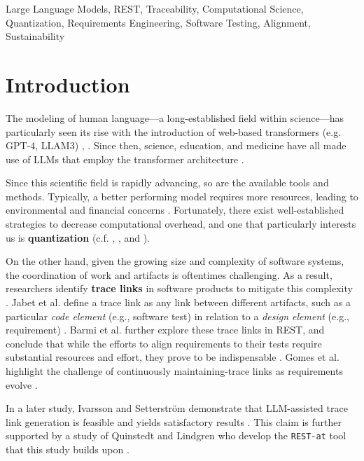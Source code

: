 \documentclass[conference]{IEEEtran}
\begin{document}
\begin{IEEEkeywords}
Large Language Models, REST, Traceability, Computational Science, Quantization,
Requirements Engineering, Software Testing, Alignment, Sustainability
\end{IEEEkeywords}

\section{Introduction}\label{intro}

The modeling of human language---a long-established field within science---has
particularly seen its rise with the introduction of web-based transformers (e.g.
GPT-4, LLAM3) \cite{jones1994Natural}, \cite{vaswani2017Attention}. Since then,
science, education, and medicine have all made use of LLMs that employ the
transformer architecture \cite{naveed2024Comprehensive}.

Since this scientific field is rapidly advancing, so are the available tools and
methods. Typically, a better performing model requires more resources, leading
to environmental and financial concerns \cite{naveed2024Comprehensive}.
Fortunately, there exist well-established strategies to decrease computational
overhead, and one that particularly interests us is \textbf{quantization} (c.f.
\cite{zhu2024Survey}, \cite{lin2024AWQ}, and \cite{chen2024EfficientQAT}).

On the other hand, given the growing size and complexity of software systems,
the coordination of work and artifacts is oftentimes challenging. As a result,
researchers identify \textbf{trace links} in software products to mitigate this
complexity \cite{jaber2013Effect}. Jabet et al. define a trace link as any link
between different artifacts, such as a particular \textit{code element} (e.g.,
software test) in relation to a \textit{design element} (e.g., requirement)
\cite{jaber2013Effect}. Barmi et al. further explore these trace links in REST,
and conclude that while the efforts to align requirements to their tests require
substantial resources and effort, they prove to be indispensable
\cite{barmi2011Alignment}. Gomes et al. highlight the challenge of continuously
maintaining-trace links as requirements evolve \cite{gomes2017Challenges}.

In a later study, Ivarsson and Setterström demonstrate that LLM-assisted
trace link generation is feasible and yields satisfactory results
\cite{ivarsson2023automated}. This claim is further supported by a study of
Quinstedt and Lindgren who develop the \verb|REST-at| tool that this study
builds upon \cite{quinstedt2024Optimizing}. 
\end{document}
